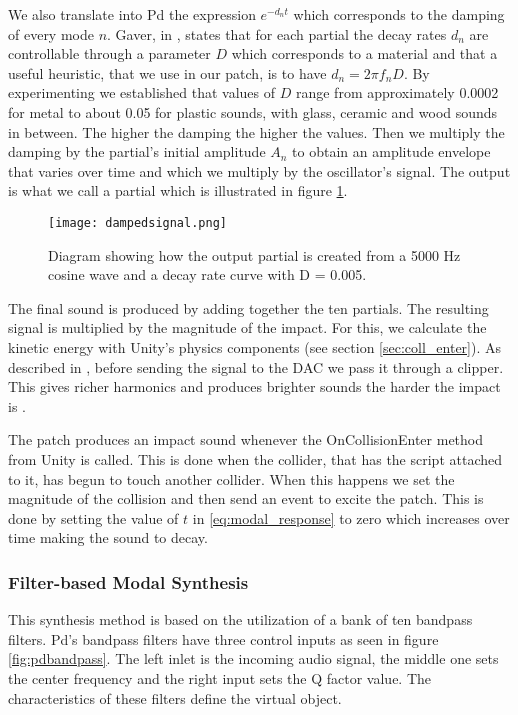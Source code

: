 We also translate into Pd the expression $e^{-d_n t}$ which corresponds to the damping of every mode $n$. Gaver, in \cite{gaver1993we}, states that for each partial the decay rates $d_n$ are controllable through a parameter $D$ which corresponds to a material and that a useful heuristic, that we use in our patch, is to have $d_n = 2 \pi f_nD$. By experimenting we established that values of $D$ range from approximately 0.0002 for metal to about 0.05 for plastic sounds, with glass, ceramic and wood sounds in between. The higher the damping the higher the values. Then we multiply the damping by the partial's initial amplitude $A_n$ to obtain an amplitude envelope that varies over time and which we multiply by the oscillator's signal. The output is what we call a partial which is illustrated in figure \ref{fig:dampedsignal}. 

\begin{figure}[H]
  \centering
    \texttt{[image: dampedsignal.png]}
      \caption{Diagram showing how the output partial is created from a 5000 Hz cosine wave and a decay rate curve with D = 0.005.}
      \label{fig:dampedsignal}
\end{figure}

The final sound is produced by adding together the ten partials. The resulting signal is multiplied by the magnitude of the impact. For this, we calculate the kinetic energy with Unity\textsuperscript{\textregistered}'s physics components (see section \ref{sec:coll_enter}). As described in \cite{farnell2010designing}, before sending the signal to the DAC we pass it through a clipper. This gives richer harmonics and produces brighter sounds the harder the impact is \cite{aramaki2009thinking}.

The patch produces an impact sound whenever the OnCollisionEnter method from Unity\textsuperscript{\textregistered} is called. This is done when the collider, that has the script attached to it, has begun to touch another collider. When this happens we set the magnitude of the collision and then send an event to excite the patch. This is done by setting the value of $t$ in \ref{eq:modal_response} to zero which increases over time making the sound to decay.

\subsubsection{Filter-based Modal Synthesis}\label{sec:filter_synth}

This synthesis method is based on the utilization of a bank of ten bandpass filters. Pd's bandpass filters have three control inputs as seen in figure \ref{fig:pdbandpass}. The left inlet is the incoming audio signal, the middle one sets the center frequency and the right input sets the Q factor value. The characteristics of these filters define the virtual object.

